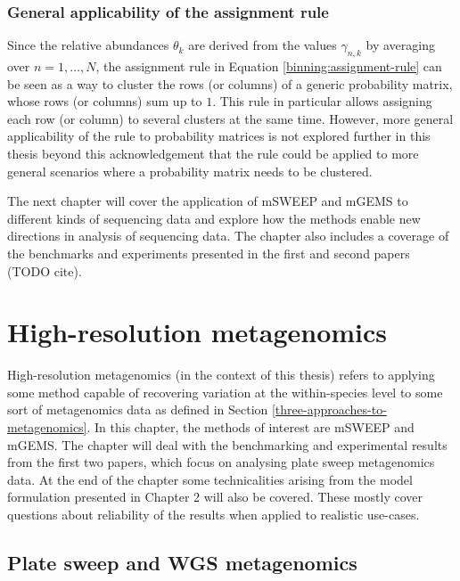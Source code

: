 \documentclass[officiallayout]{tktla}
\begin{document}
\subsection{General applicability of the assignment rule}

Since the relative abundances $\theta_k$ are derived from the values
$\gamma_{n, k}$ by averaging over $n = 1, \dots, N$, the assignment
rule in Equation \eqref{binning:assignment-rule} can be seen as a way to
cluster the rows (or columns) of a generic probability matrix, whose
rows (or columns) sum up to $1$. This rule in particular allows
assigning each row (or column) to several clusters at the same
time. However, more general applicability of the rule to probability
matrices is not explored further in this thesis beyond this
acknowledgement that the rule could be applied to more general
scenarios where a probability matrix needs to be clustered.

The next chapter will cover the application of mSWEEP and mGEMS to
different kinds of sequencing data and explore how the methods enable
new directions in analysis of sequencing data. The chapter also
includes a coverage of the benchmarks and experiments presented in the
first and second papers (TODO cite).

\chapter{High-resolution metagenomics}

High-resolution metagenomics (in the context of this thesis) refers to
applying some method capable of recovering variation at the
within-species level to some sort of metagenomics data as defined in
Section \ref{three-approaches-to-metagenomics}. In this chapter, the
methods of interest are mSWEEP and mGEMS. The chapter will deal with
the benchmarking and experimental results from the first two papers,
which focus on analysing plate sweep metagenomics data. At the end of
the chapter some technicalities arising from the model formulation
presented in Chapter 2 will also be covered. These mostly cover
questions about reliability of the results when applied to realistic
use-cases.

\section{Plate sweep and WGS metagenomics}
\end{document}
